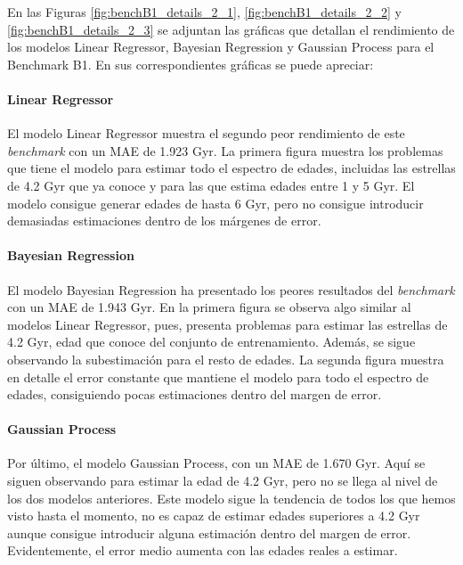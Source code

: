 En las Figuras \ref{fig:benchB1_details_2_1}, \ref{fig:benchB1_details_2_2} y \ref{fig:benchB1_details_2_3} se adjuntan las gráficas que detallan el rendimiento de los modelos Linear Regressor, Bayesian Regression y Gaussian Process para el Benchmark B1. En sus correspondientes gráficas se puede apreciar:

\paragraph{Linear Regressor} 
El modelo Linear Regressor muestra el segundo peor rendimiento de este \emph{benchmark} con un MAE de 1.923 Gyr. La primera figura muestra los problemas que tiene el modelo para estimar todo el espectro de edades, incluidas las estrellas de 4.2 Gyr que ya conoce y para las que estima edades entre 1 y 5 Gyr. El modelo consigue generar edades de hasta 6 Gyr, pero no consigue introducir demasiadas estimaciones dentro de los márgenes de error. %

\paragraph{Bayesian Regression} 
El modelo Bayesian Regression ha presentado los peores resultados del \emph{benchmark} con un MAE de 1.943 Gyr. En la primera figura se observa algo similar al modelos Linear Regressor, pues, presenta problemas para estimar las estrellas de 4.2 Gyr, edad que conoce del conjunto de entrenamiento. Además, se sigue observando la subestimación para el resto de edades. La segunda figura muestra en detalle el error constante que mantiene el modelo para todo el espectro de edades, consiguiendo pocas estimaciones dentro del margen de error. %

\paragraph{Gaussian Process} 
Por último, el modelo Gaussian Process, con un MAE de 1.670 Gyr. Aquí se siguen observando para estimar la edad de 4.2 Gyr, pero no se llega al nivel de los dos modelos anteriores. Este modelo sigue la tendencia de todos los que hemos visto hasta el momento, no es capaz de estimar edades superiores a 4.2 Gyr aunque consigue introducir alguna estimación dentro del margen de error. Evidentemente, el error medio aumenta con las edades reales a estimar. %

